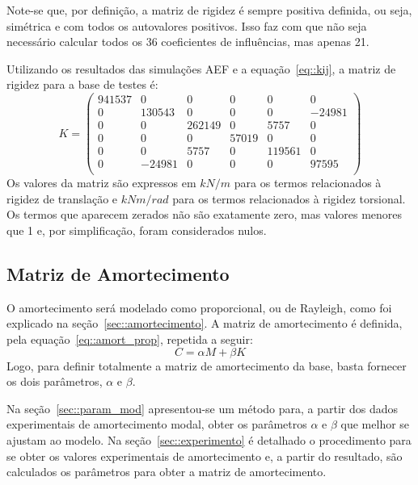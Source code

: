 Note-se que, por definição, a matriz de rigidez é sempre positiva
definida, ou seja, simétrica e com
todos os autovalores positivos.
Isso faz com que não seja necessário calcular todos os 36 coeficientes de influências, mas apenas 21. 

Utilizando os resultados das simulações AEF e a equação~\ref{eq::kij}, a matriz
de rigidez para a base de testes é:
%
\begin{equation*}
	K =
\begin{pmatrix}
941537	&	0	&	0	&	0	&	0	&	0 \\
0	&	130543	&	0	&	0	&	0	&	-24981 \\
0	&	0	&	262149	&	0	&	5757	&	0 \\
0	&	0	&	0	&	57019	&	0	&	0 \\
0	&	0	&	5757	&	0	&	119561	&	0 \\
0	&	-24981	&	0	&	0	&	0	&	97595 \\
\end{pmatrix}
\end{equation*}
%
Os valores da matriz são expressos em $kN/m$ para os termos relacionados à
rigidez de translação e $kNm/rad$ para os termos relacionados à rigidez
torsional.
Os termos que aparecem zerados não são exatamente zero, mas valores menores que 1 e, por
simplificação, foram considerados nulos.


\subsection{Matriz de Amortecimento}

O amortecimento será modelado como proporcional, ou de Rayleigh, como foi
explicado na seção~\ref{sec::amortecimento}. A matriz de amortecimento é
definida, pela equação~\ref{eq::amort_prop}, repetida a seguir:
%
\begin{equation*}
	C = \alpha M + \beta K
\end{equation*}
%
Logo, para definir totalmente a matriz de amortecimento da base, basta fornecer
os dois parâmetros, $\alpha$ e $\beta$.

Na seção~\ref{sec::param_mod} apresentou-se um método para, a partir dos dados
experimentais de amortecimento modal, obter os parâmetros $\alpha$ e $\beta$ que
melhor se ajustam ao modelo. Na seção~\ref{sec::experimento} é detalhado o
procedimento para se obter os valores experimentais de amortecimento e, a partir
do resultado, são calculados os parâmetros para obter a matriz de amortecimento.



